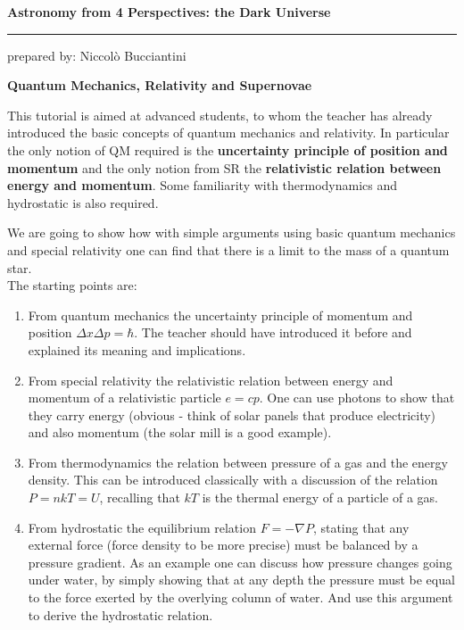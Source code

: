 \documentclass[a4paper,12pt]{article}
\newcommand{\HRule}{\rule{\linewidth}{0.3mm}}
\begin{document}
\pagestyle{empty}

\center
{\LARGE \textbf{Astronomy from 4 Perspectives: the Dark Universe}}
\endcenter

\HRule

\begin{flushright}
prepared by: Niccol{\`o} Bucciantini
\end{flushright}

\center
{\Large \textbf{Quantum Mechanics, Relativity and Supernovae}}
\endcenter

\justify

This tutorial is aimed at advanced students, to whom the teacher has
already introduced the basic concepts of quantum mechanics and
relativity. In particular the only notion of QM required is the {\bf
  uncertainty principle of position and momentum} and the only notion
from SR the {\bf relativistic
relation between energy and momentum}. Some familiarity with
thermodynamics and hydrostatic is also required.

We are going to show how with  simple arguments using basic quantum
mechanics and special relativity one can find that there is a limit to
the mass of a quantum star.\\

The starting points are:
\begin{enumerate}
\item From quantum mechanics the uncertainty principle  of momentum and
position $\Delta x \Delta p
=\hbar$. The teacher should have introduced it before and explained its
meaning and implications.
\item From special relativity the relativistic relation between energy
  and momentum of a relativistic particle $e=cp$. One can use photons
  to show that they carry energy (obvious - think of solar panels that
  produce electricity) and also momentum (the solar mill is a good example).
\item From thermodynamics the relation between pressure of a gas and
  the energy density. This can be introduced classically with a
  discussion of the relation $P = n kT = U$, recalling that $kT$ is
  the thermal energy of a particle of a gas.
\item From hydrostatic the equilibrium relation $F = -\nabla P$,
  stating that any external force (force density to be more precise) must be balanced by a pressure
  gradient. As an example one can discuss how pressure changes going
  under water, by simply showing that at any depth the pressure must
  be equal to the force exerted by the overlying column of water. And
  use this argument to derive the hydrostatic relation. 
\end{enumerate}
\end{document}
